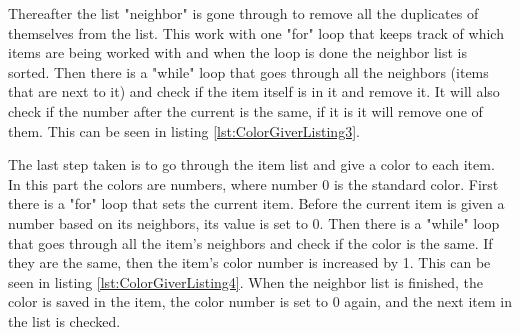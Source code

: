 Thereafter the list "neighbor" is gone through to remove all the duplicates of themselves from the list. This work with one "for" loop that keeps track of which items are being worked with and when the loop is done the neighbor list is sorted. Then there is a "while" loop that goes through all the neighbors (items that are next to it) and check if the item itself is in it and remove it. It will also check if the number after the current is the same, if it is it will remove one of them. This can be seen in listing \ref{lst:ColorGiverListing3}.

The last step taken is to go through the item list and give a color to each item. In this part the colors are numbers, where number 0 is the standard color. First there is a "for" loop that sets the current item. Before the current item is given a number based on its neighbors, its value is set to 0. Then there is a "while" loop that goes through all the item's neighbors and check if the color is the same. If they are the same, then the item's color number is increased by 1. This can be seen in listing \ref{lst:ColorGiverListing4}. When the neighbor list is finished, the color is saved in the item, the color number is set to 0 again, and the next item in the list is checked.

